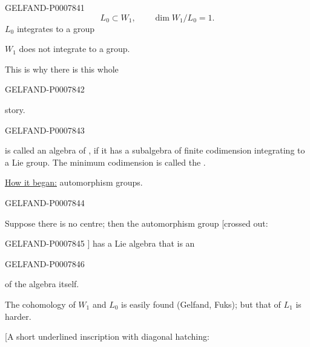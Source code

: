 \begin{GelfandAdjacentEvidence}{GELFAND-P000784}{1}
\[
L_0\subset W_1,\qquad \dim W_1/L_0=1.
\]
\(L_0\) integrates to a group

\(W_1\) does not integrate to a group.

This is why there is this whole
\end{GelfandAdjacentEvidence}
\begin{GelfandAdjacentEvidence}{GELFAND-P000784}{2}

story.

\end{GelfandAdjacentEvidence}
\begin{GelfandAdjacentEvidence}{GELFAND-P000784}{3}


 is called an algebra of , if it
has a subalgebra of finite codimension integrating to a Lie group.
The minimum codimension is called the .

\underline{How it began:} automorphism groups.

\end{GelfandAdjacentEvidence}
\begin{GelfandAdjacentEvidence}{GELFAND-P000784}{4}

Suppose there is no centre; then the automorphism group [crossed out:
\end{GelfandAdjacentEvidence}
\begin{GelfandAdjacentEvidence}{GELFAND-P000784}{5}
]
has a Lie algebra that is an
\end{GelfandAdjacentEvidence}
\begin{GelfandAdjacentEvidence}{GELFAND-P000784}{6}

of the algebra itself.

The cohomology of \(W_1\) and \(L_0\) is easily found (Gelfand, Fuks);
but that of \(L_1\) is harder.

[A short underlined inscription with diagonal hatching:
\end{GelfandAdjacentEvidence}
